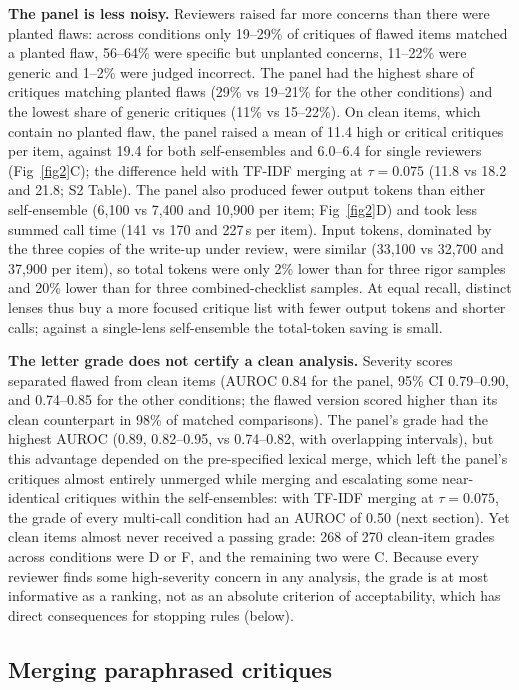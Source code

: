 \documentclass[10pt,letterpaper]{article}
\begin{document}
\textbf{The panel is less noisy.} Reviewers raised far more concerns than there were planted flaws: across conditions only 19--29\% of critiques of flawed items matched a planted flaw, 56--64\% were specific but unplanted concerns, 11--22\% were generic and 1--2\% were judged incorrect. The panel had the highest share of critiques matching planted flaws (29\% vs 19--21\% for the other conditions) and the lowest share of generic critiques (11\% vs 15--22\%). On clean items, which contain no planted flaw, the panel raised a mean of 11.4 high or critical critiques per item, against 19.4 for both self-ensembles and 6.0--6.4 for single reviewers (Fig~\ref{fig2}C); the difference held with TF-IDF merging at $\tau=0.075$ (11.8 vs 18.2 and 21.8; S2 Table). The panel also produced fewer output tokens than either self-ensemble (6,100 vs 7,400 and 10,900 per item; Fig~\ref{fig2}D) and took less summed call time (141 vs 170 and 227\,s per item). Input tokens, dominated by the three copies of the write-up under review, were similar (33,100 vs 32,700 and 37,900 per item), so total tokens were only 2\% lower than for three rigor samples and 20\% lower than for three combined-checklist samples. At equal recall, distinct lenses thus buy a more focused critique list with fewer output tokens and shorter calls; against a single-lens self-ensemble the total-token saving is small.

\textbf{The letter grade does not certify a clean analysis.} Severity scores separated flawed from clean items (AUROC 0.84 for the panel, 95\% CI 0.79--0.90, and 0.74--0.85 for the other conditions; the flawed version scored higher than its clean counterpart in 98\% of matched comparisons). The panel's grade had the highest AUROC (0.89, 0.82--0.95, vs 0.74--0.82, with overlapping intervals), but this advantage depended on the pre-specified lexical merge, which left the panel's critiques almost entirely unmerged while merging and escalating some near-identical critiques within the self-ensembles: with TF-IDF merging at $\tau=0.075$, the grade of every multi-call condition had an AUROC of 0.50 (next section). Yet clean items almost never received a passing grade: 268 of 270 clean-item grades across conditions were D or F, and the remaining two were C. Because every reviewer finds some high-severity concern in any analysis, the grade is at most informative as a ranking, not as an absolute criterion of acceptability, which has direct consequences for stopping rules (below).

\subsection*{Merging paraphrased critiques}
\end{document}
